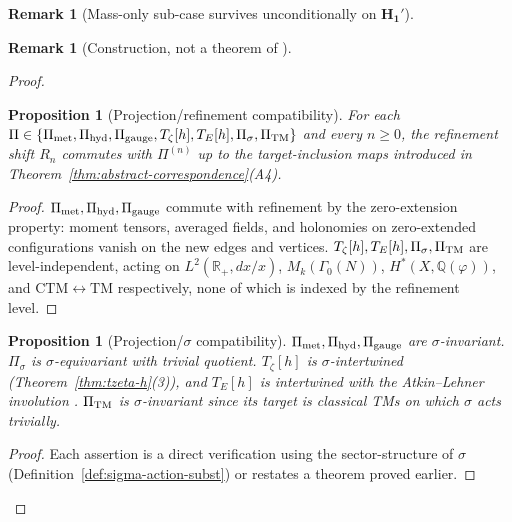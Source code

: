 \documentclass[11pt, a4paper]{amsart}
\newtheorem{proposition}[theorem]{Proposition}
\theoremstyle{definition}
\newtheorem{remark}[theorem]{Remark}
\newcommand{\R}{\mathbb{R}}
\newcommand{\Q}{\mathbb{Q}}
\newcommand{\pphi}{\varphi}
\newcommand{\met}{{\rm met}}
\newcommand{\hyd}{{\rm hyd}}
\newcommand{\gge}{{\rm gauge}}
\newcommand{\TM}{{\rm TM}}
\begin{document}
\begin{remark}[Mass-only sub-case survives unconditionally on $\mathbf{H_1'}$]
\begin{remark}[Construction, not a theorem of \cite{CascadeEmbeddings}]
\begin{proof}
\begin{proposition}[Projection/refinement compatibility]
\label{prop:proj-refine-compat}
For each
$\Pi \in \{\Pi_{\met}, \Pi_{\hyd}, \Pi_{\gge}, T_\zeta[h], T_E[h],
\Pi_\sigma, \Pi_{\TM}\}$ and every $n \geq 0$, the refinement
shift $R_n$ commutes with $\Pi^{(n)}$ up to the target-inclusion
maps introduced in Theorem~\ref{thm:abstract-correspondence}(A4).
\end{proposition}

\begin{proof}
$\Pi_{\met}, \Pi_{\hyd}, \Pi_{\gge}$ commute with refinement by the
zero-extension property: moment tensors, averaged fields, and
holonomies on zero-extended configurations vanish on the new edges
and vertices. $T_\zeta[h], T_E[h], \Pi_\sigma, \Pi_{\TM}$ are
level-independent, acting on $L^2(\R_+, dx/x)$,
$M_k(\Gamma_0(N))$, $H^*(X, \Q(\pphi))$, and
$\mathrm{CTM} \leftrightarrow \mathrm{TM}$ respectively, none of
which is indexed by the refinement level.
\end{proof}

\begin{proposition}[Projection/$\sigma$ compatibility]
\label{prop:proj-sigma-compat}
$\Pi_{\met}, \Pi_{\hyd}, \Pi_{\gge}$ are $\sigma$-invariant.
$\Pi_\sigma$ is $\sigma$-equivariant with trivial quotient.
$T_\zeta[h]$ is $\sigma$-intertwined (Theorem~\ref{thm:tzeta-h}(3)),
and $T_E[h]$ is intertwined with the Atkin--Lehner involution
\cite[\S 5.5]{DiamondShurman}.
$\Pi_{\TM}$ is $\sigma$-invariant since its target is classical
TMs on which $\sigma$ acts trivially.
\end{proposition}

\begin{proof}
Each assertion is a direct verification using the sector-structure
of $\sigma$ (Definition~\ref{def:sigma-action-subst}) or restates a
theorem proved earlier.
\end{proof}


\end{proof}
\end{remark}
\end{remark}
\end{document}
